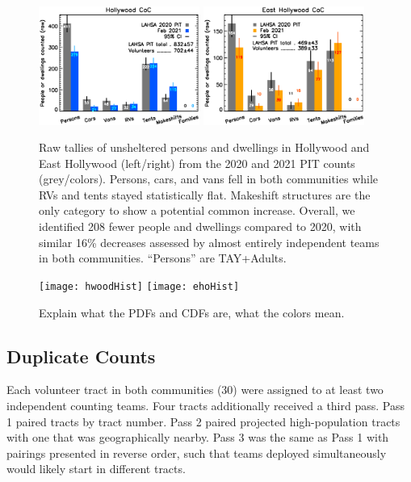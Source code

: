 \documentclass[11pt,twocolumn]{article}
\begin{document}
\begin{figure}[t]
	\centering
	\includegraphics[width = 0.47\textwidth, trim = 1cm 0cm 0cm 0cm]{Hwood2021Bars}
	\includegraphics[width = 0.47\textwidth, trim = 0cm 0cm 1cm 0cm]{Eho2021Bars}
	\caption{Raw tallies of unsheltered persons and dwellings in Hollywood and East Hollywood
			(left/right) from the 2020 and 2021 PIT counts (grey/colors). Persons, cars, 
			and vans fell in both communities while RVs and tents stayed statistically flat. 
			Makeshift structures are the only category to show a potential common increase. 
			Overall, we identified 208 fewer people and dwellings compared to 2020,
			with similar 16\% decreases assessed by almost entirely independent teams
			in both communities. ``Persons'' are TAY+Adults.}
	\label{fig:rawCounts}
\end{figure}

\begin{figure}[t]
	\centering
	\texttt{[image: hwoodHist]}
	\texttt{[image: ehoHist]}
	\caption{Explain what the PDFs and CDFs are, what the colors mean.}
	\label{fig:communityPDFs}
\end{figure}

\subsection{Duplicate Counts}
\label{sec:dupes}

Each volunteer tract in both communities (30) were assigned to at least two independent counting teams.
Four tracts additionally received a third pass. Pass 1 paired tracts by tract number. Pass 2 paired projected 
high-population tracts with one that was geographically nearby. Pass 3 was the same as Pass 1 with 
pairings presented in reverse order, such that teams deployed simultaneously would likely start in different 
tracts. 
\end{document}

